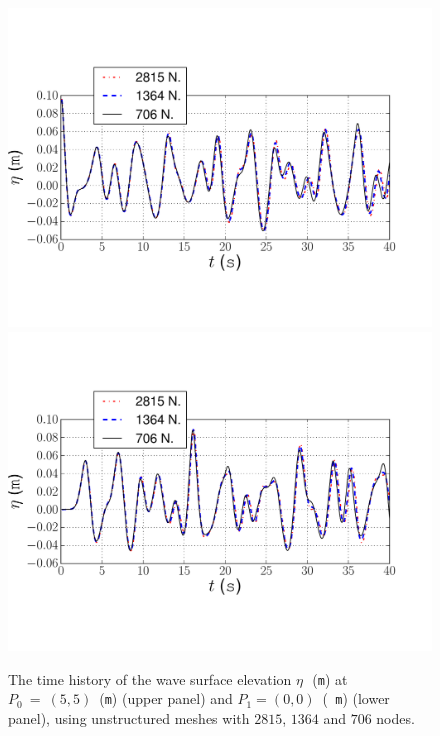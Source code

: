 \begin{figure}
{\centering
\includegraphics[width=\largefig]{chapters/lopes/pdf/unstr.pdf}
\includegraphics[width=\largefig]{chapters/lopes/pdf/unstrcorner.pdf}
\caption{The  time history  of the wave surface elevation
$\eta$\,~({\tt m}) at
$P_0~=~(5,5)$~({\tt m}) (upper panel) and  $P_1=(0,0)$~({\tt
m}) (lower panel), using
unstructured meshes with $2815$, $1364$ and $706$ nodes.}\par}
\label{fig:lopes:unstmesh}
\end{figure}
